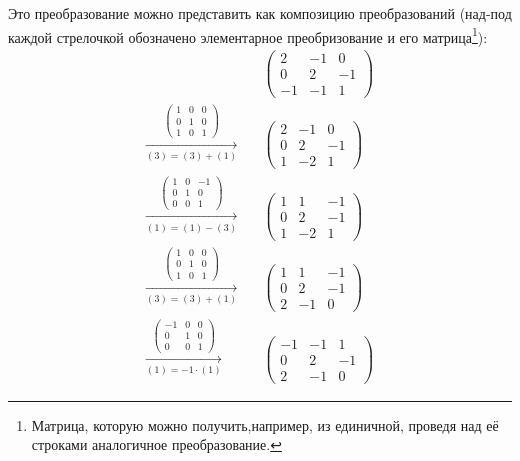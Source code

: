 \documentclass[a4paper,12pt]{article}
\begin{document}
\begin{solution}
    Это преобразование можно представить как композицию преобразований (над-под каждой стрелочкой обозначено элементарное преобризование и его матрица\footnote{Матрица, которую можно получить,например, из единичной, проведя над её строками аналогичное преобразование.}):
    \begin{equation*}
    \begin{split}
      &\begin{pmatrix}
        2 & -1 & 0\\
        0 & 2 & -1\\
        -1 & -1 & 1
      \end{pmatrix}\\
      \xrightarrow[(3) = (3) + (1)]{\left(\begin{smallmatrix}1 & 0 & 0\\0 & 1 & 0\\1 & 0 & 1\end{smallmatrix}\right)}\quad &\begin{pmatrix}
          2 & -1 & 0\\
          0 & 2 & -1\\
          1 & -2 & 1
        \end{pmatrix}\\
      \xrightarrow[(1) = (1) - (3)]{\left(\begin{smallmatrix}1 & 0 & -1\\0 & 1 & 0\\0 & 0 & 1\end{smallmatrix}\right)}\quad &\begin{pmatrix}
          1 & 1 & -1\\
          0 & 2 & -1\\
          1 & -2 & 1
        \end{pmatrix}\\
      \xrightarrow[(3) = (3) + (1)]{\left(\begin{smallmatrix}1 & 0 & 0\\0 & 1 & 0\\1 & 0 & 1\end{smallmatrix}\right)}\quad &\begin{pmatrix}
          1 & 1 & -1\\
          0 & 2 & -1\\
          2 & -1 & 0
        \end{pmatrix}\\
      \xrightarrow[(1) = -1 \cdot (1)]{\left(\begin{smallmatrix}-1 & 0 & 0\\0 & 1 & 0\\0 & 0 & 1\end{smallmatrix}\right)}\quad &\begin{pmatrix}
          -1 & -1 & 1\\
          0 & 2 & -1\\
          2 & -1 & 0
        \end{pmatrix}
    \end{split}
    \end{equation*}
    

\end{solution}
\end{document}
